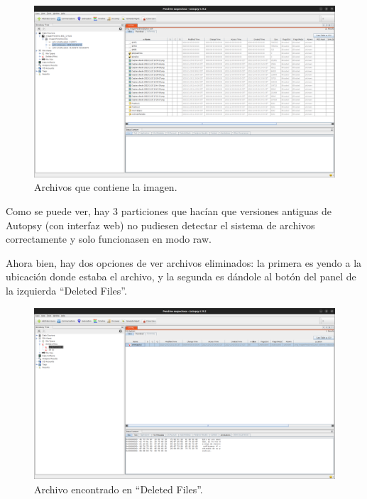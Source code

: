 \documentclass{article}
\begin{document}
\begin{figure}[H]
    \centering
    \includegraphics[width=\textwidth]{imagenes/Captura desde 2022-12-03 21-47-44.png}
    \caption{Archivos que contiene la imagen.}
\end{figure}

Como se puede ver, hay 3 particiones que hacían que versiones antiguas de Autopsy (con interfaz web) no pudiesen detectar el sistema de archivos correctamente y solo funcionasen en modo raw.

\bigskip

Ahora bien, hay dos opciones de ver archivos eliminados: la primera es yendo a la ubicación donde estaba el archivo, y la segunda es dándole al botón del panel de la izquierda ``Deleted Files''.

\begin{figure}[H]
    \centering
    \includegraphics[width=\textwidth]{imagenes/Captura desde 2022-12-03 21-52-53.png}
    \caption{Archivo encontrado en ``Deleted Files''.}
\end{figure}
\end{document}
